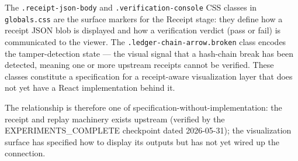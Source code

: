 The \texttt{.receipt-json-body} and \texttt{.verification-console} CSS classes in
\texttt{globals.css} are the surface markers for the Receipt stage: they define how a receipt
JSON blob is displayed and how a verification verdict (pass or fail) is communicated to the
viewer. The \texttt{.ledger-chain-arrow.broken} class encodes the tamper-detection state ---
the visual signal that a hash-chain break has been detected, meaning one or more upstream
receipts cannot be verified. These classes constitute a specification for a receipt-aware
visualization layer that does not yet have a React implementation behind it.

The relationship is therefore one of specification-without-implementation: the receipt and
replay machinery exists upstream (verified by the EXPERIMENTS\_COMPLETE checkpoint dated
2026-05-31); the visualization surface has specified how to display its outputs but has not
yet wired up the connection.
